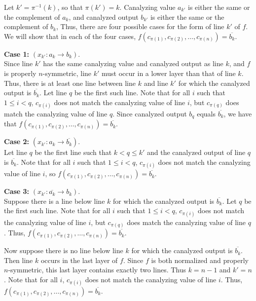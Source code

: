 Let $k' = \pi^{-1}(k)$, so that $\pi(k') = k$.
Canalyzing value $a_{k'}$ is either the same or the complement of $a_k$,
and canalyzed output $b_{k'}$ is either the same or the complement of $b_k$,
Thus, there are four possible cases for the form of line $k'$ of $f$.
We will show that in each of the four cases,
$f(c_{\pi(1)}, c_{\pi(2)}, \ldots, c_{\pi(n)}) = \overline{b_k}$.

{\bf Case 1:} $(x_{k'} : a_k \rightarrow b_k)$. \\
Since line $k'$ has the same canalyzing value and canalyzed output as line $k$,
and $f$ is properly $n$-symmetric,
line $k'$ must occur in a lower layer than that of line $k$.
Thus, there is at least one line between line $k$ and line $k'$ for which the canalyzed output is $\overline{b_k}$.
Let line $q$ be the first such line.
Note that for all $i$ such that $1 \leq i < q$, 
$c_{\pi(i)}$ does not match the canalyzing value of line $i$,
but $c_{\pi(q)}$ does match the canalyzing value of line $q$.
Since canalyzed output $b_q$ equals $\overline{b_k}$,
we have that $f(c_{\pi(1)}, c_{\pi(2)}, \ldots, c_{\pi(n)}) = \overline{b_k}$.

{\bf Case 2:} $(x_{k'} : a_k \rightarrow \overline{b_k})$. \\
Let line $q$ be the first line such that $k < q \leq k'$ and
the canalyzed output of line $q$ is $\overline{b_k}$.
Note that for all $i$ such that $1 \leq i < q$, 
$c_{\pi(i)}$ does not match the canalyzing value of line $i$,
so $f(c_{\pi(1)}, c_{\pi(2)}, \ldots, c_{\pi(n)}) = \overline{b_k}$.

{\bf Case 3:} $(x_{k'} : \overline{a_k} \rightarrow b_k)$. \\
Suppose there is a line below line $k$ for which the canalyzed output is $\overline{b_k}$.
Let $q$ be the first such line.
Note that for all $i$ such that $1 \leq i < q$, 
$c_{\pi(i)}$ does not match the canalyzing value of line $i$,
but $c_{\pi(q)}$ does match the canalyzing value of line $q$.
Thus, $f(c_{\pi(1)}, c_{\pi(2)}, \ldots, c_{\pi(n)}) = \overline{b_k}$.

Now suppose there is no line below line $k$ for which the canalyzed output is $\overline{b_k}$.
Then line $k$ occurs in the last layer of $f$.
Since $f$ is both normalized and properly $n$-symmetric,
this last layer contains exactly two lines.
Thus $k = n-1$ and $k' = n$.
Note that for all $i$, 
$c_{\pi(i)}$ does not match the canalyzing value of line $i$.
Thus, $f(c_{\pi(1)}, c_{\pi(2)}, \ldots, c_{\pi(n)}) = \overline{b_k}$.

